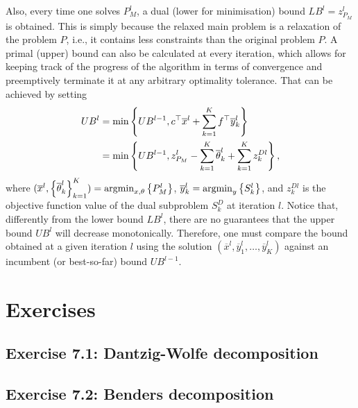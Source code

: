 Also, every time one solves $P_M^l$, a dual (lower for minimisation) bound $LB^l = z_{P_M}^l$ is obtained. This is simply because the relaxed main problem is a relaxation of the problem $P$, i.e., it contains less constraints than the original problem $P$. A primal (upper) bound can also be calculated at every iteration, which allows for keeping track of the progress of the algorithm in terms of convergence and preemptively terminate it at any arbitrary optimality tolerance. That can be achieved by setting
%
\begin{align*}
	UB^l &= \min\left\{ UB^{l-1}, c^\top \overline{x}^l + \sum_{k=1}^K f^\top \overline{y}_k^l \right \} \\	
	&= \min\left\{ UB^{l-1}, z_{P_M}^l - \sum_{k=1}^K \overline{\theta}_k^l + \sum_{k=1}^K z^{Dl}_{k} \right \},
\end{align*}
%
where $(\overline{x}^l, \left\{ \overline{\theta}^{l}_k \right \}_{k=1}^K) = \mathop{\rm argmin}_{x, \theta} \left\{ P_M^l \right \}$, $\overline{y}_k^l = \mathop{\rm argmin}_y \left\{ S_k^l \right \}$, and $z^{Dl}_{k}$ is the objective function value of the dual subproblem $S_k^D$ at iteration $l$. Notice that, differently from the lower bound $LB^l$, there are no guarantees that the upper bound $UB^l$ will decrease monotonically. Therefore, one must compare the bound obtained at a given iteration $l$ using the solution $(\overline{x}^l, \overline{y}_1^l,\dots, \overline{y}^l_K)$ against an incumbent (or best-so-far) bound $UB^{l-1}$.


\pagebreak	

\section{Exercises}

\subsection*{Exercise 7.1: Dantzig-Wolfe decomposition}


%

\subsection*{Exercise 7.2: Benders decomposition}


